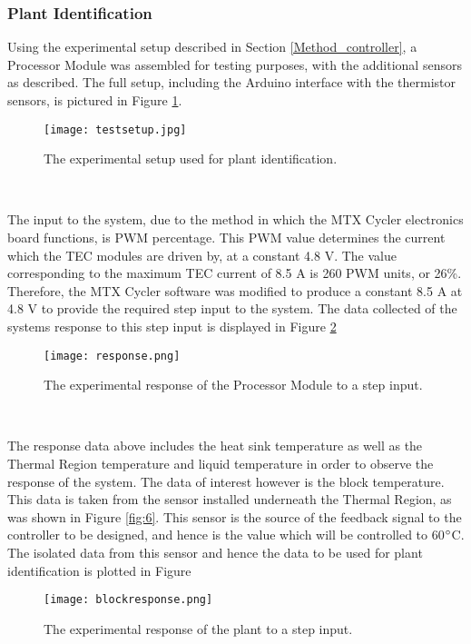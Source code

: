 \subsubsection{Plant Identification}
\label{sec:plantidentification}
Using the experimental setup described in Section \ref{Method_controller}, a Processor Module was assembled for testing purposes, with the additional sensors as described. The full setup, including the Arduino interface with the thermistor sensors, is pictured in Figure \ref{fig:plantidentification]}.

\begin{figure}[!htb]
	\centering
	\texttt{[image: testsetup.jpg]}
	\caption[Plant Identification Setup.]{The experimental setup used for plant identification.}
	\label{fig:plantidentification]}
\end{figure} 
\FloatBarrier

The input to the system, due to the method in which the MTX Cycler electronics board functions, is PWM percentage. This PWM value determines the current which the TEC modules are driven by, at a constant 4.8 V. The value corresponding to the maximum TEC current of 8.5 A is 260 PWM units, or 26\%. Therefore, the MTX Cycler software was modified to produce a constant 8.5 A at 4.8 V to provide the required step input to the system. The data collected of the systems response to this step input is displayed in Figure \ref{fig:response]}

\begin{figure}[!htb]
	\centering
	\texttt{[image: response.png]}
	\caption[Full System Response to Step Input.]{The experimental response of the Processor Module to a step input.}
	\label{fig:response]}
\end{figure} 
\FloatBarrier

The response data above includes the heat sink temperature as well as the Thermal Region temperature and liquid temperature in order to observe the response of the system. The data of interest however is the block temperature. This data is taken from the sensor installed underneath the Thermal Region, as was shown in Figure \ref{fig:6}. This sensor is the source of the feedback signal to the controller to be designed, and hence is the value which will be controlled to 60$\degree$C. The isolated data from this sensor and hence the data to be used for plant identification is plotted in Figure 

\begin{figure}[!htb]
	\centering
	\texttt{[image: blockresponse.png]}
	\caption[Plant Response to Step Input.]{The experimental response of the plant to a step input.}
	\label{fig:blockresponse]}
\end{figure} 
\FloatBarrier

